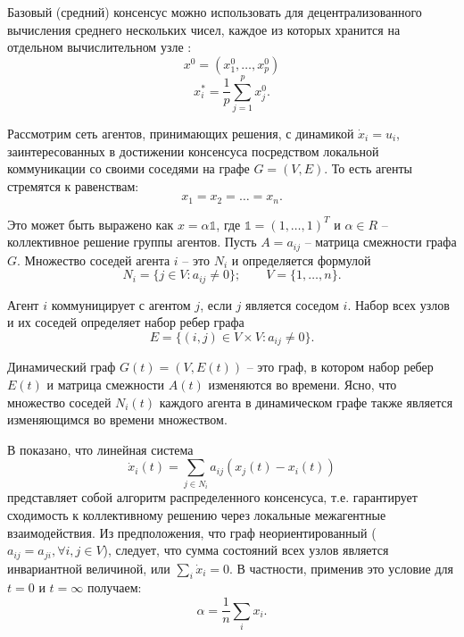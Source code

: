 \documentclass[a4paper,article,14pt]{extarticle}
\begin{document}
Базовый (средний) консенсус можно использовать для децентрализованного вычисления среднего нескольких чисел, каждое из которых хранится на отдельном вычислительном узле \cite{consensus_basics}:
\begin{equation}
x^0 = (x_1^0, \ldots, x_p^0)
\end{equation}
\begin{equation}
x_i^* = \frac{1}{p}\sum_{j=1}^{p}x_j^0.
\end{equation}

Рассмотрим сеть агентов, принимающих решения, с динамикой $\dot x_i = u_i$, заинтересованных в достижении консенсуса посредством локальной коммуникации со своими соседями на графе $G = (V, E)$.
То есть агенты стремятся к равенствам:
\begin{equation}
x_1 = x_2 = \ldots = x_n.
\end{equation}

Это может быть выражено как $x = \alpha \mathds{1} $, где $\mathds{1} = (1, \ldots, 1)^T$ и $\alpha \in R$ -- коллективное решение группы агентов. Пусть $A = a_{ij}$ -- матрица смежности графа $G$. Множество соседей агента $i$ -- это $N_i$ и определяется формулой
\begin{equation}
N_i = \{ j \in V: a_{ij} \ne 0 \}; \quad \quad V = \{1, \ldots, n\}.
\end{equation}

Агент $i$ коммуницирует с агентом $j$, если $j$ является соседом $i$. Набор всех узлов и их соседей определяет набор ребер графа
\begin{equation}
E = \{ (i,j) \in V\times V: a_{ij} \ne 0\}.
\end{equation}

Динамический граф $G(t) = (V, E(t))$ -- это граф, в котором набор ребер $E(t)$ и матрица смежности $A(t)$ изменяются во времени. Ясно, что множество соседей $N_i(t)$ каждого агента в динамическом графе также является изменяющимся во времени множеством.

В \cite{consensus_basics_2} показано, что линейная система
\begin{equation} \label{eq:system_dynamic}
\dot x_i(t) = \sum_{j \in N_i} a_{ij}(x_j(t)-x_i(t))
\end{equation}
представляет собой алгоритм распределенного консенсуса, т.е. гарантирует сходимость к коллективному решению через локальные межагентные взаимодействия. Из предположения, что граф неориентированный ($a_{ij}=a_{ji}, \forall i,j \in V$), следует, что сумма состояний всех узлов является инвариантной величиной, или $\sum_i \dot x_i = 0$. В частности, применив это условие для $t = 0 \text{ и } t = \infty$ получаем:
\begin{equation}
\alpha = \frac{1}{n}\sum_i x_i.
\end{equation}
\end{document}
